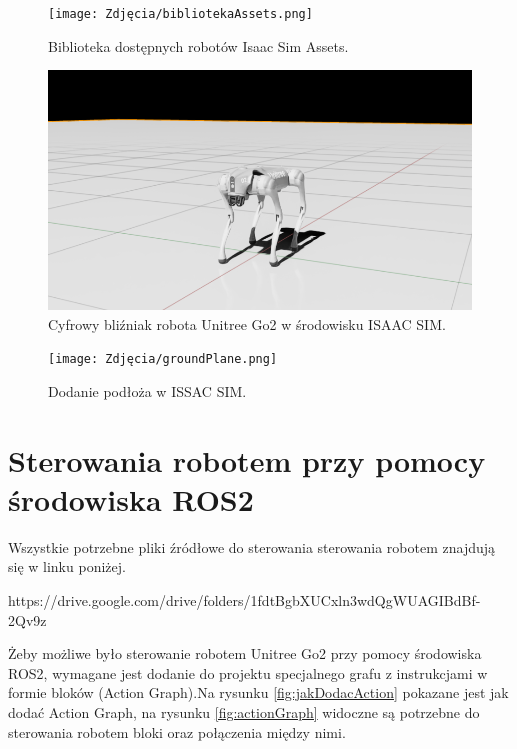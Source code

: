 \documentclass[12pt]{article}
\begin{document}
\begin{figure}[h]
    \centering
    \texttt{[image: Zdjęcia/bibliotekaAssets.png]}
    \caption{Biblioteka dostępnych robotów Isaac Sim Assets.}
    \label{fig:Assets}
\end{figure}



\begin{figure}[h]
    \centering
    \includegraphics[width=0.75\linewidth]{Zdjęcia/cyfrowyBlizniakUnitryGo2.png}
    \caption{Cyfrowy bliźniak robota Unitree Go2 w środowisku ISAAC SIM.}
    \label{fig:cyfrowyBlizniak}
\end{figure}

\begin{figure}[h]
    \centering
    \texttt{[image: Zdjęcia/groundPlane.png]}
    \caption{Dodanie podłoża w ISSAC SIM.}
    \label{fig:groundPlane}
\end{figure}

\clearpage

\section{Sterowania robotem przy pomocy środowiska ROS2}

Wszystkie potrzebne pliki źródłowe do sterowania sterowania robotem znajdują się w linku poniżej.

https://drive.google.com/drive/folders/1fdtBgbXUCxln3wdQgWUAGIBdBf-2Qv9z
\vspace{10pt}

Żeby możliwe było sterowanie robotem Unitree Go2 przy pomocy środowiska ROS2, wymagane jest dodanie do projektu specjalnego grafu z instrukcjami w formie bloków (Action Graph).Na rysunku \ref{fig:jakDodacAction} pokazane jest jak dodać Action Graph, na rysunku \ref{fig:actionGraph} widoczne są potrzebne do sterowania robotem bloki oraz połączenia między nimi. 
\end{document}
